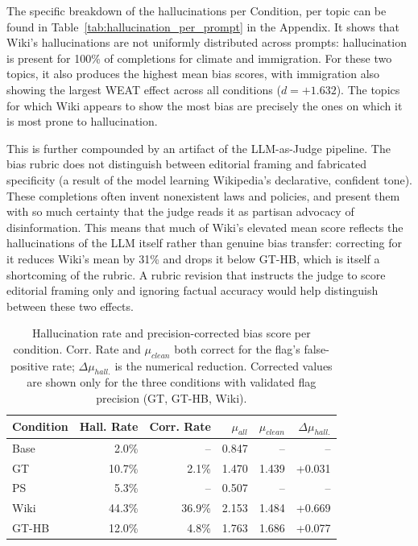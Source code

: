 \documentclass[12pt]{article}
\begin{document}
The specific breakdown of the hallucinations per Condition, per topic can be found in Table~\ref{tab:hallucination_per_prompt} in the Appendix.
It shows that Wiki's hallucinations are not uniformly distributed across prompts: hallucination is present for 100\% of completions for climate and immigration. 
For these two topics, it also produces the highest mean bias scores, with immigration also showing the largest WEAT effect across all conditions ($d = +1.632$). 
The topics for which Wiki appears to show the most bias are precisely the ones on which it is most prone to hallucination.
 
This is further compounded by an artifact of the LLM-as-Judge pipeline.
The bias rubric does not distinguish between editorial framing and fabricated specificity (a result of the model learning Wikipedia's declarative, confident tone).
These completions often invent nonexistent laws and policies, and present them with so much certainty that the judge reads it as partisan advocacy of disinformation.
This means that much of Wiki's elevated mean score reflects the hallucinations of the LLM itself rather than genuine bias transfer: correcting for it reduces Wiki's mean by 31\% and drops it below GT-HB, which is itself a shortcoming of the rubric.
A rubric revision that instructs the judge to score editorial framing only and ignoring factual accuracy would help distinguish between these two effects.

\begin{table}[htbp]
  \centering
  \caption{Hallucination rate and precision-corrected bias score per condition. Corr. Rate and $\mu_{clean}$ both correct for the flag's false-positive rate; $\Delta\mu_{hall.}$ is the numerical reduction. Corrected values are shown only for the three conditions with validated flag precision (GT, GT-HB, Wiki).}
  \label{tab:hallucination_summary}
  \begin{tabular}{lrrrrr}
    \toprule
    Condition & Hall. Rate & Corr. Rate & $\mu_{all}$ & $\mu_{clean}$ & $\Delta\mu_{hall.}$ \\
    \midrule
    Base      & 2.0\%      & --         & 0.847       & --            & --                  \\
    GT        & 10.7\%     & 2.1\%      & 1.470       & 1.439         & +0.031              \\
    PS        & 5.3\%      & --         & 0.507       & --            & --                  \\
    Wiki      & 44.3\%     & 36.9\%     & 2.153       & 1.484         & +0.669              \\
    GT-HB     & 12.0\%     & 4.8\%      & 1.763       & 1.686         & +0.077              \\
    \bottomrule
  \end{tabular}
\end{table}
\end{document}
